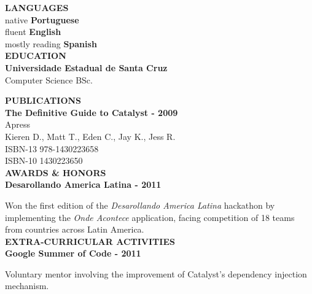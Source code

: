 \documentclass[a4paper,oneside]{memoir}
\begin{document}
\begin{multicols}{2}
\begin{flushright}
\normalsize

\vspace{1em}
\Large\textbf{\color{RoyalBlue}\uppercase{Languages}}\normalsize\\

native
\textbf{Portuguese}\\

fluent
\textbf{English}\\

mostly reading
\textbf{Spanish}\\

\vspace{1em}
\Large\textbf{\color{RoyalBlue}\uppercase{Education}}\normalsize\\
\textbf{Universidade Estadual de Santa Cruz}\normalsize\\
Computer Science BSc.\\

\vspace{1em}

\Large\textbf{\color{RoyalBlue}\uppercase{Publications}}\normalsize\\
\textbf{The Definitive Guide to Catalyst - 2009}\\
\scriptsize
Apress\\
Kieren D., Matt T., Eden C., Jay K., Jess R.\\
ISBN-13 978-1430223658\\
ISBN-10 1430223650\\
\normalsize
\vspace{1em}
\Large\textbf{\color{RoyalBlue}\uppercase{Awards \& Honors}}\normalsize\\
\textbf{Desarollando America Latina - 2011}\\

\scriptsize

Won the first edition of the \emph{Desarollando America Latina} hackathon by
implementing the \emph{Onde Acontece} application, facing competition of 18
teams from countries across Latin America.\\

\normalsize
\vspace{1em}
\Large\textbf{\color{RoyalBlue}\uppercase{Extra-Curricular Activities}}\normalsize\\
\textbf{Google Summer of Code - 2011}\\
\scriptsize

Voluntary mentor involving the improvement of Catalyst's dependency injection
mechanism.\\


\end{flushright}
\end{multicols}
\end{document}
